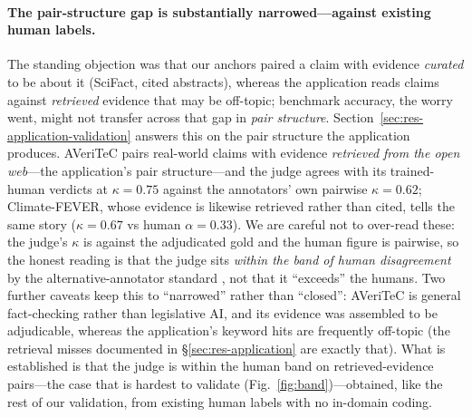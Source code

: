 \paragraph{The pair-structure gap is substantially narrowed---against existing human labels.} The
standing objection was that our anchors paired a claim with evidence \emph{curated} to be about it
(SciFact, cited abstracts), whereas the application reads claims against \emph{retrieved} evidence that may
be off-topic; benchmark accuracy, the worry went, might not transfer across that gap in \emph{pair
structure}. Section~\ref{sec:res-application-validation} answers this on the pair structure the application
produces. AVeriTeC \citep{schlichtkrull2023averitec} pairs real-world claims with evidence \emph{retrieved
from the open web}---the application's pair structure---and the judge agrees with its trained-human
verdicts at $\kappa=0.75$ against the annotators' own pairwise $\kappa=0.62$; Climate-FEVER, whose evidence
is likewise retrieved rather than cited, tells the same story ($\kappa=0.67$ vs human $\alpha=0.33$). We
are careful not to over-read these: the judge's $\kappa$ is against the adjudicated gold and the human
figure is pairwise, so the honest reading is that the judge sits \emph{within the band of human
disagreement} by the alternative-annotator standard \citep{calderon2025alttest}, not that it ``exceeds''
the humans. Two further caveats keep this to ``narrowed'' rather than ``closed'': AVeriTeC is general
fact-checking rather than legislative AI, and its evidence was assembled to be adjudicable, whereas the
application's keyword hits are frequently off-topic (the retrieval misses documented in
\S\ref{sec:res-application} are exactly that). What is established is that the judge is within the human band
on retrieved-evidence pairs---the case that is hardest to validate
(Fig.~\ref{fig:band})---obtained, like the rest of our validation, from existing human labels with no
in-domain coding.


